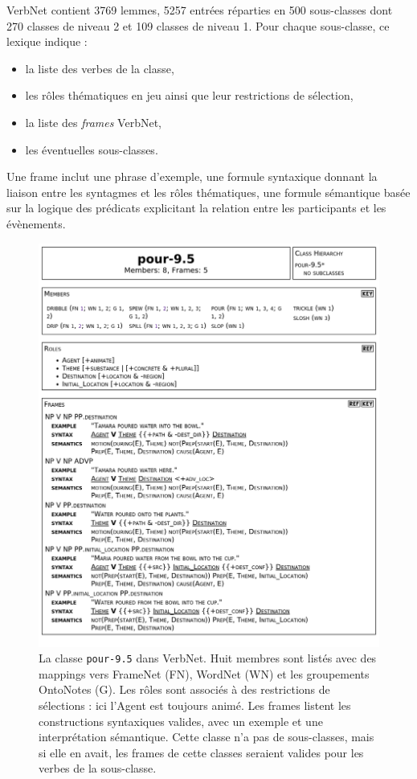 VerbNet contient 3769 lemmes, 5257 entrées réparties en 500 sous-classes dont
270 classes de niveau 2 et 109 classes de niveau 1. Pour chaque sous-classe, ce
lexique indique :

\begin{itemize}
        \item la liste des verbes de la classe,
        \item les rôles thématiques en jeu ainsi que leur restrictions de sélection,
        \item la liste des \emph{frames} VerbNet,
        \item les éventuelles sous-classes.
\end{itemize}

Une frame inclut une phrase d'exemple, une formule syntaxique donnant la
liaison entre les syntagmes et les rôles thématiques, une formule sémantique
basée sur la logique des prédicats explicitant la relation entre les
participants et les évènements.

\begin{figure}[p]
    \centering
    \includegraphics[width=\textwidth]{fig/verbnet_pour_class.png}
    \caption{\label{fig:exemple_verbnet}La classe \texttt{pour-9.5} dans
    VerbNet. Huit membres sont listés avec des mappings vers FrameNet (FN),
    WordNet (WN) et les groupements OntoNotes (G). Les rôles sont associés à
    des restrictions de sélections : ici l'Agent est toujours animé. Les frames
    listent les constructions syntaxiques valides, avec un exemple et une
    interprétation sémantique. Cette classe n'a pas de sous-classes, mais si
    elle en avait, les frames de cette classes seraient valides pour les verbes
    de la sous-classe.}
\end{figure}

